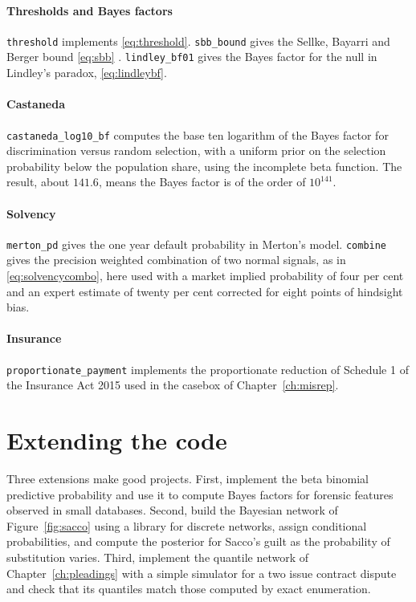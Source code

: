 \paragraph{Thresholds and Bayes factors} \texttt{threshold} implements \eqref{eq:threshold}. \texttt{sbb\_bound} gives the Sellke, Bayarri and Berger bound \eqref{eq:sbb} \citep{sellke2001}. \texttt{lindley\_bf01} gives the Bayes factor for the null in Lindley's paradox, \eqref{eq:lindleybf}.

\paragraph{Castaneda} \texttt{castaneda\_log10\_bf} \citep{castaneda1977} computes the base ten logarithm of the Bayes factor for discrimination versus random selection, with a uniform prior on the selection probability below the population share, using the incomplete beta function. The result, about $141.6$, means the Bayes factor is of the order of $10^{141}$.

\paragraph{Solvency} \texttt{merton\_pd} gives the one year default probability in Merton's model. \texttt{combine} gives the precision weighted combination of two normal signals, as in \eqref{eq:solvencycombo}, here used with a market implied probability of four per cent and an expert estimate of twenty per cent corrected for eight points of hindsight bias.

\paragraph{Insurance} \texttt{proportionate\_payment} implements the proportionate reduction of Schedule 1 of the Insurance Act 2015 used in the casebox of Chapter~\ref{ch:misrep}.

\section{Extending the code}

Three extensions make good projects. First, implement the beta binomial predictive probability and use it to compute Bayes factors for forensic features observed in small databases. Second, build the Bayesian network of Figure~\ref{fig:sacco} using a library for discrete networks, assign conditional probabilities, and compute the posterior for Sacco's guilt as the probability of substitution varies. Third, implement the quantile network of Chapter~\ref{ch:pleadings} with a simple simulator for a two issue contract dispute and check that its quantiles match those computed by exact enumeration.
